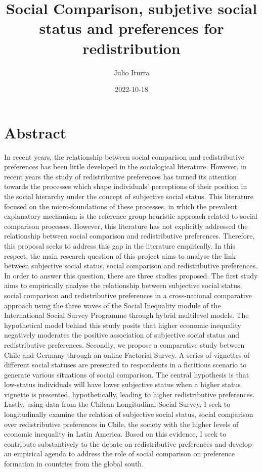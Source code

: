 \documentclass[
  12pt,
]{book}
\title{Social Comparison, subjetive social status and preferences for redistribution}
\author{Julio Iturra}
\date{2022-10-18}
\begin{document}
\maketitle

{
\hypersetup{linkcolor=}
\setcounter{tocdepth}{1}
\tableofcontents
}
\listoffigures
\listoftables
{}
\hypertarget{abstract}{%
\chapter*{Abstract}\label{abstract}}

In recent years, the relationship between social comparison and redistributive preferences has been little developed in the sociological literature. However, in recent years the study of redistributive preferences has turned its attention towards the processes which shape individuals' perceptions of their position in the social hierarchy under the concept of subjective social status. This literature focused on the micro-foundations of these processes, in which the prevalent explanatory mechanism is the reference group heuristic approach related to social comparison processes. However, this literature has not explicitly addressed the relationship between social comparison and redistributive preferences. Therefore, this proposal seeks to address this gap in the literature empirically. In this respect, the main research question of this project aims to analyse the link between subjective social status, social comparison and redistributive preferences. In order to answer this question, there are three studies proposed. The first study aims to empirically analyse the relationship between subjective social status, social comparison and redistributive preferences in a cross-national comparative approach using the three waves of the Social Inequality module of the International Social Survey Programme through hybrid multilevel models. The hypothetical model behind this study posits that higher economic inequality negatively moderates the positive association of subjective social status and redistributive preferences. Secondly, we propose a comparative study between Chile and Germany through an online Factorial Survey. A series of vignettes of different social statuses are presented to respondents in a fictitious scenario to generate various situations of social comparison. The central hypothesis is that low-status individuals will have lower subjective status when a higher status vignette is presented, hypothetically, leading to higher redistributive preferences. Lastly, using data from the Chilean Longitudinal Social Survey, I seek to longitudinally examine the relation of subjective social status, social comparison over redistributive preferences in Chile, the society with the higher levels of economic inequality in Latin America. Based on this evidence, I seek to contribute substantively to the debate on redistributive preferences and develop an empirical agenda to address the role of social comparison on preference formation in countries from the global south.
\end{document}
